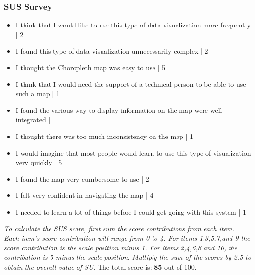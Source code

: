 \documentclass[twocolumn, letterpaper,13pt]{scrartcl}
\begin{document}
    \subsubsection*{SUS Survey}
    \begin{itemize}
        \item I think that I would like to use this type of data visualization more frequently | 2
        \item I found this type of data visualization unnecessarily complex | 2
        \item I thought the Choropleth map was easy to use | 5
        \item I think that I would need the support of a technical person to be able to use such a map | 1
        \item I found the various way to display information on the map were well integrated | %
        \item I thought there was too much inconsistency on the map | 1
        \item I would imagine that most people would learn to use this type of visualization very quickly | 5
        \item I found the map very cumbersome to use | 2
        \item I felt very confident in navigating the map | 4
        \item I needed to learn a lot of things before I could get going with this system | 1
    \end{itemize}
    
    \textit{To calculate the SUS score, first sum the score contributions from each item. Each item's score contribution will range from 0 to 4. For items 1,3,5,7,and 9 the score contribution is the scale position minus 1. For items 2,4,6,8 and 10, the contribution is 5 minus the scale position. Multiply the sum of the scores by 2.5 to obtain the overall value of SU}.
    \newline\newline
    The total score is: \textbf{85} out of 100.
    
\end{document}
